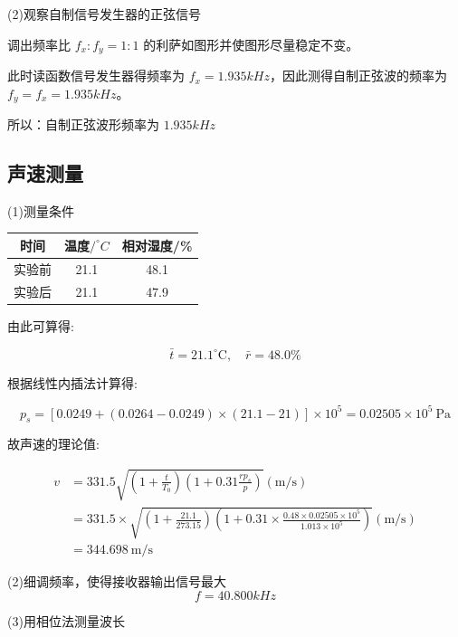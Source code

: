 \documentclass[UTF8]{ctexart}
\begin{document}
\noindent (2)观察自制信号发生器的正弦信号

调出频率比 $f_x : f_y = 1 : 1$ 的利萨如图形并使图形尽量稳定不变。

此时读函数信号发生器得频率为 $f_x = 1.935kHz$，因此测得自制正弦波的频率为 $f_y = f_x = 1.935kHz$。

所以：自制正弦波形频率为 $1.935 kHz$

\subsection{声速测量}

\noindent (1)测量条件
\begin{center}
    \begin{tabular}{|c|c|c|}
        \hline  时间&温度$/^\circ C$&相对湿度/\%\\
        \hline  实验前&21.1&48.1\\
        \hline  实验后&21.1&47.9\\
        \hline
    \end{tabular}
\end{center}

由此可算得:

$$
\bar{t}=21.1^{\circ} \mathrm{C}, \quad \bar{r}=48.0 \%
$$

根据线性内插法计算得:

$$
p_{s}=[0.0249+(0.0264-0.0249) \times(21.1-21)] \times 10^{5}=0.02505 \times 10^{5} \mathrm{~Pa}
$$

故声速的理论值:

\begin{align}
    v&=331.5 \sqrt{\left(1+\frac{t}{T_{0}}\right)\left(1+0.31 \frac{r p_{s}}{p}\right)}(\mathrm{m} / \mathrm{s}) \nonumber \\
    &=331.5\times \sqrt{\left(1+\frac{21.1}{273.15}\right)\left(1+0.31\times \frac{0.48 \times 0.02505 \times 10^{5}}{1.013 \times 10^{5}}\right)}(\mathrm{m} / \mathrm{s}) \nonumber\\
    &= 344.698\mathrm{~m} / \mathrm{s} \nonumber
\end{align}




\noindent (2)细调频率，使得接收器输出信号最大
$$
f=40.800kHz
$$

\noindent (3)用相位法测量波长
 
\end{document}
